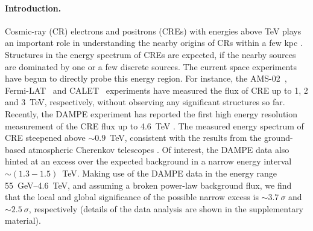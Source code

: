 \documentclass[aps,prl,twocolumn,a4paper]{revtex4}
\begin{document}
\paragraph{\bf Introduction.}
Cosmic-ray (CR)  electrons and positrons (CREs)
with energies above TeV  plays an important role in understanding 
the nearby origins of CRs within a few kpc
\cite{Shen:1970apj}.
%
Structures in the energy spectrum of CREs are expected, 
if the nearby sources are dominated by one or a few discrete sources.
%
The current space experiments have begun to directly probe  this energy region.
For instance, 
the AMS-02~\cite{Aguilar:2014fea}, 
Fermi-LAT~\cite{Abdollahi:2017nat} and 
CALET~\cite{Adriani:2017efm} experiments have measured 
the  flux of CRE up to 1, 2 and 3~TeV, respectively,  
without observing any significant structures so far.
Recently, 
the DAMPE experiment has reported  the first high energy resolution 
measurement of  the CRE flux up to  4.6~TeV
\cite{Chang:2017xx}.
The measured energy spectrum of CRE 
steepened above $\sim0.9$~TeV,
consistent with the  results from 
the ground-based atmospheric Cherenkov telescopes
\cite{
	Aharonian:2008aa,%
	Aharonian:2009ah,%
	HESS:2017ICRC,%
	BorlaTridon:2011dk,%
	Staszak:2015kza%
}.
Of interest, the DAMPE data  also hinted at an excess over  
the expected background  in a narrow energy interval  $\sim(1.3-1.5)$~TeV.
Making use of the  DAMPE data in the energy range 55~GeV--4.6~TeV, and 
assuming  a broken power-law background flux,
we find that the local and global significance of the possible narrow excess is
$\sim 3.7~\sigma$ and $\sim2.5~\sigma$, respectively
(details of the data analysis are shown in the supplementary material).
%
\end{document}
